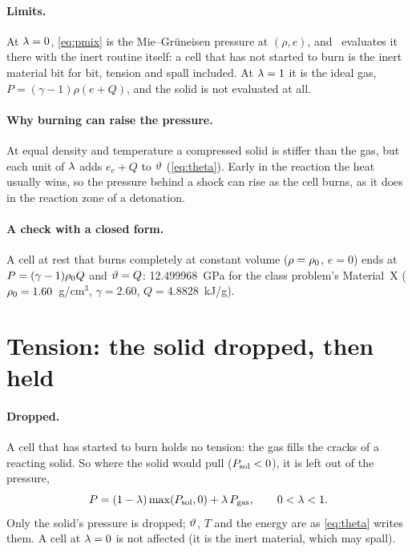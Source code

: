 \paragraph{Limits.} At $\lambda = 0$, \cref{eq:pmix} is the Mie--Gr\"uneisen
pressure at $(\rho, e)$, and \bw\ evaluates it there with the inert
routine itself: a cell that has not started to burn is the inert material
bit for bit, tension and spall included. At $\lambda = 1$ it is the ideal gas,
$P = (\gamma - 1)\rho(e + Q)$, and the solid is not evaluated at all.

\paragraph{Why burning can raise the pressure.} At equal density and
temperature a compressed solid is stiffer than the gas, but each unit of
$\lambda$ adds $e_c + Q$ to $\vartheta$ (\cref{eq:theta}). Early in the reaction
the heat usually wins, so the pressure behind a shock can rise as the cell
burns, as it does in the reaction zone of a detonation.

\paragraph{A check with a closed form.} A cell at rest that burns
completely at constant volume ($\rho = \rho_0$, $e = 0$) ends at
$P = (\gamma - 1)\rho_0 Q$ and $\vartheta = Q$: 12.499968~GPa for the class
problem's Material~X ($\rho_0 = 1.60$~g/cm$^3$, $\gamma = 2.60$,
$Q = 4.8828$~kJ/g).

\section{Tension: the solid dropped, then held}
\label{sec:tension}

\paragraph{Dropped.} A cell that has started to burn holds no tension: the
gas fills the cracks of a reacting solid. So where the solid would pull
($P_{\mathrm{sol}} < 0$), it is left out of the pressure,
\begin{equation}
  P = (1 - \lambda)\max(P_{\mathrm{sol}}, 0) + \lambda\,P_{\mathrm{gas}}, \qquad 0 < \lambda < 1.
  \label{eq:dropped}
\end{equation}
Only the solid's pressure is dropped; $\vartheta$, $T$ and the energy are as
\cref{eq:theta} writes them. A cell at $\lambda = 0$ is not affected (it is the
inert material, which may spall).

